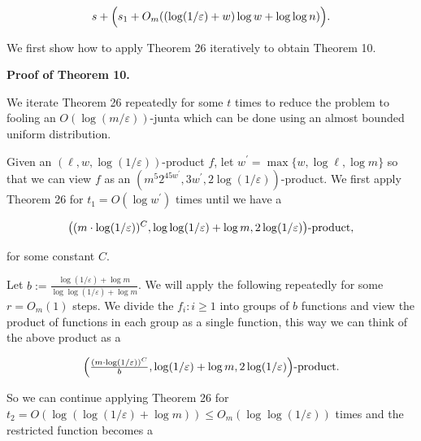 \[\begin{gathered}
s+\Bigl{(}s_{1}+O_{m}((\log(1/\varepsilon)+w)\log w+\log\log n)\Bigr{)}.
\end{gathered}\]






We first show how to apply Theorem 26 iteratively to obtain Theorem 10.\par




\par\medskip\noindent\textbf{Proof of Theorem 10.}\par




We iterate Theorem 26 repeatedly for some $t$ times to reduce the problem to fooling an $O(\log(m/\varepsilon))$-junta which can be done using an almost bounded uniform distribution.\par




Given an $(\ell,w,\log(1/\varepsilon))$-product $f$, let $w^{\prime}=\max\{w,\log\ell,\log m\}$ so that we can view $f$ as an $(m^{5}2^{45w^{\prime}},3w^{\prime},2\log(1/\varepsilon))$-product.
We first apply Theorem 26 for $t_{1}=O(\log w^{\prime})$ times until we have a\par


\[\begin{gathered}
\bigl{(}(m\cdot\log(1/\varepsilon))^{C},\log\log(1/\varepsilon)+\log m,2\log(1/\varepsilon)\bigr{)}\text{-product},
\end{gathered}\]


for some constant $C$.\par




Let $b:=\frac{\log(1/\varepsilon)+\log m}{\log\log(1/\varepsilon)+\log m}$.
We will apply the following repeatedly for some $r=O_{m}(1)$ steps.
We divide the $f_{i}:i\geq 1$ into groups of $b$ functions and view the product of functions in each group as a single function, this way we can think of the above product as a\par


\[\begin{gathered}
\Bigl{(}\tfrac{(m\cdot\log(1/\varepsilon))^{C}}{b},\log(1/\varepsilon)+\log m,2\log(1/\varepsilon)\Bigr{)}\text{-product.}
\end{gathered}\]


So we can continue applying Theorem 26 for $t_{2}=O(\log(\log(1/\varepsilon)+\log m))\leq O_{m}(\log\log(1/\varepsilon))$ times and the restricted function becomes a\par


